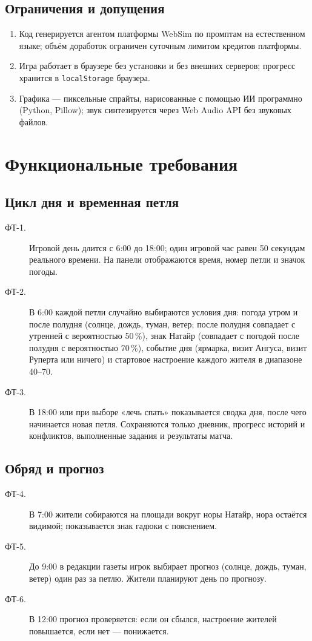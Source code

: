 \documentclass[12pt]{article}
\begin{document}
\subsection{Ограничения и допущения}
\begin{enumerate}
\item Код генерируется агентом платформы WebSim по промптам на естественном языке; объём доработок ограничен суточным лимитом кредитов платформы.
\item Игра работает в браузере без установки и без внешних серверов; прогресс хранится в \texttt{localStorage} браузера.
\item Графика — пиксельные спрайты, нарисованные с помощью ИИ программно (Python, Pillow); звук синтезируется через Web Audio API без звуковых файлов.
\end{enumerate}

\section{Функциональные требования}
\subsection{Цикл дня и временная петля}
\begin{description}
\item[ФТ-1.] Игровой день длится с 6:00 до 18:00; один игровой час равен 50 секундам реального времени. На панели отображаются время, номер петли и значок погоды.
\item[ФТ-2.] В 6:00 каждой петли случайно выбираются условия дня: погода утром и после полудня (солнце, дождь, туман, ветер; после полудня совпадает с утренней с вероятностью 50\,\%), знак Натайр (совпадает с погодой после полудня с вероятностью 70\,\%), событие дня (ярмарка, визит Ангуса, визит Руперта или ничего) и стартовое настроение каждого жителя в диапазоне 40–70.
\item[ФТ-3.] В 18:00 или при выборе «лечь спать» показывается сводка дня, после чего начинается новая петля. Сохраняются только дневник, прогресс историй и конфликтов, выполненные задания и результаты матча.
\end{description}

\subsection{Обряд и прогноз}
\begin{description}
\item[ФТ-4.] В 7:00 жители собираются на площади вокруг норы Натайр, нора остаётся видимой; показывается знак гадюки с пояснением.
\item[ФТ-5.] До 9:00 в редакции газеты игрок выбирает прогноз (солнце, дождь, туман, ветер) один раз за петлю. Жители планируют день по прогнозу.
\item[ФТ-6.] В 12:00 прогноз проверяется: если он сбылся, настроение жителей повышается, если нет — понижается.
\end{description}
\end{document}
